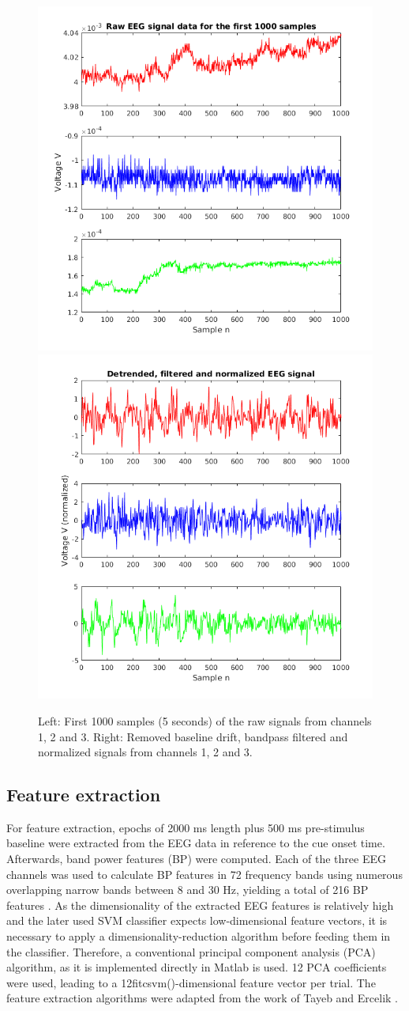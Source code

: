 \documentclass[a4paper,oneside, openright,12pt]{report}
\begin{document}
\begin{figure}[htbp!]
	\centering
	\includegraphics[width=0.49\linewidth]{./gfx/raw}
	\includegraphics[width=0.49\linewidth]{./gfx/filtered}
	\caption{Left: First 1000 samples (5 seconds) of the raw signals from channels 1, 2 and 3. Right: Removed baseline drift, bandpass filtered and normalized signals from channels 1, 2 and 3.}
	\label{fig:signals}
\end{figure}

\subsection{Feature extraction}
For feature extraction, epochs of 2000 ms length plus 500 ms pre-stimulus baseline were extracted from the EEG data in reference to the cue onset time. Afterwards, band power features (BP) were computed. Each of the three EEG channels was used to calculate BP features in 72 frequency bands using numerous overlapping narrow bands between 8 and 30 Hz, yielding a total of 216 BP features \cite{leeb2007brain, tayeb2017spinnaker}. As the dimensionality of the extracted EEG features is relatively high and the later used SVM classifier expects low-dimensional feature vectors, it is necessary to apply a dimensionality-reduction algorithm before feeding them in the classifier. Therefore, a conventional principal component analysis (PCA) algorithm, as it is implemented directly in Matlab is used. 12 PCA coefficients were used, leading to a 12fitcsvm()-dimensional feature vector per trial. The feature extraction algorithms were adapted from the work of Tayeb and Ercelik \cite{tayeb2017spinnaker}. 
\end{document}
